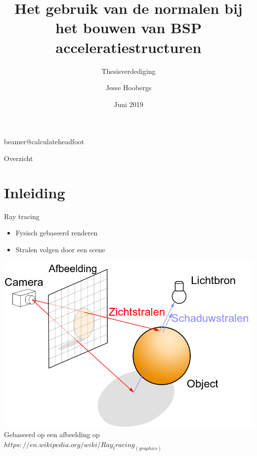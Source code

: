\documentclass[11pt,t]{beamer}
\title[Het gebruik van de normalen bij het bouwen van $\symBSP$ acceleratiestructuren]{Het gebruik van de normalen bij het bouwen van BSP acceleratiestructuren} %
\subtitle{Thesisverdediging}
\author{Jesse Hoobergs}
\institute{KU Leuven}
\date{Juni 2019}
\begin{document}
\csname beamer@calculateheadfoot\endcsname %


\begin{frame}
	\titlepage
\end{frame}
	

\begin{frame}{Overzicht}
	\hfill	{\large \parbox{.961\textwidth}{\tableofcontents[hideothersubsections]}}
\end{frame}







\section{Inleiding}
\begin{frame}{Ray tracing}  %
\begin{itemize}
	\item Fysisch gebaseerd renderen
	\item Stralen volgen door een scene
\end{itemize}
\pause
\vspace{5pt}
\hspace{5pt}
\includegraphics[height=.57\paperheight]{../img/ray-tracing}\\ 
\tiny Gebaseerd op een afbeelding op $https://en.wikipedia.org/wiki/Ray_tracing_(graphics)$

\end{frame}
\end{document}
